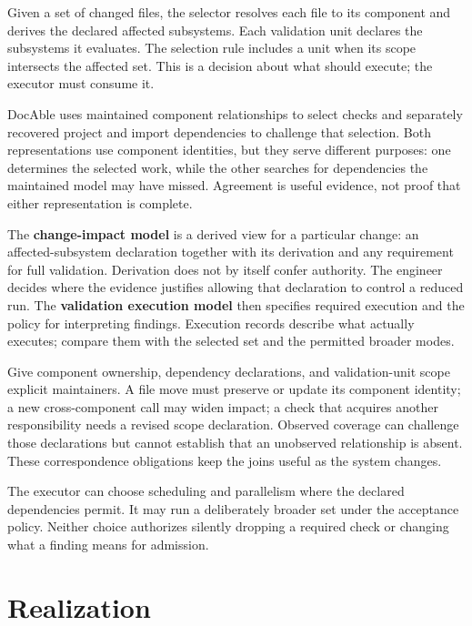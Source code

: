 Given a set of changed files, the selector resolves each file to its component and derives the declared affected subsystems. Each validation unit declares the subsystems it evaluates. The selection rule includes a unit when its scope intersects the affected set. This is a decision about what should execute; the executor must consume it.

DocAble uses maintained component relationships to select checks and separately recovered project and import dependencies to challenge that selection. Both representations use component identities, but they serve different purposes: one determines the selected work, while the other searches for dependencies the maintained model may have missed. Agreement is useful evidence, not proof that either representation is complete.

The \textbf{change-impact model} is a derived view for a particular change: an affected-subsystem declaration together with its derivation and any requirement for full validation. Derivation does not by itself confer authority. The engineer decides where the evidence justifies allowing that declaration to control a reduced run. The \textbf{validation execution model} then specifies required execution and the policy for interpreting findings. Execution records describe what actually executes; compare them with the selected set and the permitted broader modes.

Give component ownership, dependency declarations, and validation-unit scope explicit maintainers. A file move must preserve or update its component identity; a new cross-component call may widen impact; a check that acquires another responsibility needs a revised scope declaration. Observed coverage can challenge those declarations but cannot establish that an unobserved relationship is absent. These correspondence obligations keep the joins useful as the system changes.

The executor can choose scheduling and parallelism where the declared dependencies permit. It may run a deliberately broader set under the acceptance policy. Neither choice authorizes silently dropping a required check or changing what a finding means for admission.

\section{Realization}\label{heading:realization}


